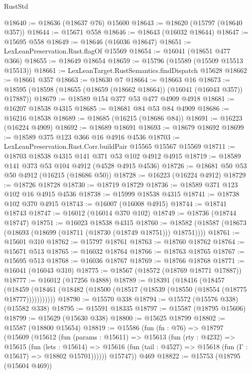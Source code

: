 \begin{lexlean}{RustStd}
\begin{coremodule}
@18640 := @18636 (@18637 @76) @15600
@18643 := @18620 (@15797 (@18640 @357))
@18644 := @15671 @558
@18646 := @18643 (@16032 @18644)
@18647 := @15695 @558
@18649 := @18646 (@16036 @18647)
@18651 := LexLeanPreservation.Rust.flagOf @15569
@18654 := @16041 (@18651 @477 @366)
@18655 := @18649 @18654
@18659 := @15796 (@15589 (@15509 @15513 @15513))
@18661 := LexLeanTarget.RustSemantics.findDispatch @15628
@18662 := @18661 @357
@18663 := @18630 @7
@18664 := @18663 @16
@18673 := @18595 (@18598 (@18655 (@18659 (@18662 @18664)) (@16041 (@16043 @357)) @17887))
@18679 := @18589 @154 @377 @53 @477 @4909 @4918
@18681 := @16207 @18538 @4315
@18685 := @18681 @84 @53 @84 @4909
@18686 := @16216 @18538
@18689 := @18685 (@16215 (@18686 @84))
@18691 := @16223 (@16224 @4909)
@18692 := @18689 @18691
@18693 := @18679 @18692
@18699 := @18589 @375 @123 @366 @16 @4916 @4536
@18703 := LexLeanPreservation.Rust.Corr.buildPair @15565 @15567 @15569
@18711 := @18703 @18538 @4315 @141 @371 @53 @102 @4912 @4915
@18719 := @18589 @141 @373 @53 @104 @4912 (@4528 @4915 @4536)
@18726 := @18681 @50 @53 @50 @4912 (@16215 (@18686 @50))
@18728 := @16223 (@16224 @4912)
@18729 := @18726 @18728
@18730 := @18719 @18729
@18736 := @18589 @371 @123 @102 @16 @4915 @4536
@18738 := @15999 @18538 @4315
@18741 := @18738 @102 @370 @4915
@18743 := @16007 (@16008 @4915)
@18744 := @18741 @18743
@18747 := @16012 (@16014 @370 @102)
@18749 := @18736 (@18744 @18747)
@18751 := @16023 @18538 @4315
@18760 := @18582 (@18587 (@18673 (@18693 (@18699 (@18711 (@18730 (@18749 @18751))) @18751))))
@18761 := @15601 @310
@18762 := @15797 @18761
@18763 := @18760 @18762
@18764 := @15671 @513
@18765 := @16032 @18764
@18766 := @18763 @18765
@18767 := @15695 @513
@18768 := @16036 @18767
@18769 := @18766 @18768
@18771 := @16041 (@16043 @310)
@18775 := @18567 (@18572 (@18769 @18771 @17887))
@18777 := @16012 (@17256 @4888)
@18789 := @18391
    (@18416
      (@18457
        (@18459 (@18461 (@18482 (@18500 (@18517 (@18539 (@18550 (@18554 (@18775 @18777)))))))))))
@18790 := @15570 @338
@18794 := @15572 (@15576 @338) (@15582 @338)
@18795 := @15591 @18335
@18797 := @15587 (@18795 @15606)
@18799 := @15629 (@15630 @338)
@18800 := @15625 @18799
@18802 := @15587 (@18800 @15654)
@18819 := @15586
    (fun (fn : @76) =>
    @18797
      (@15609
        (@15612
          (fun (params : @15611) =>
          @15613
            (fun (rty : @4232) =>
            @15615
              (fun (lets : @15614) =>
              @15616 (fun (tail : @4527) => @15618 (fun (Γ : @15617) => @18802 @15701))))))
        @15747))
    @469
@18822 := @15753 (@18795 (@15604 @469))

\end{coremodule}
\end{lexlean}
